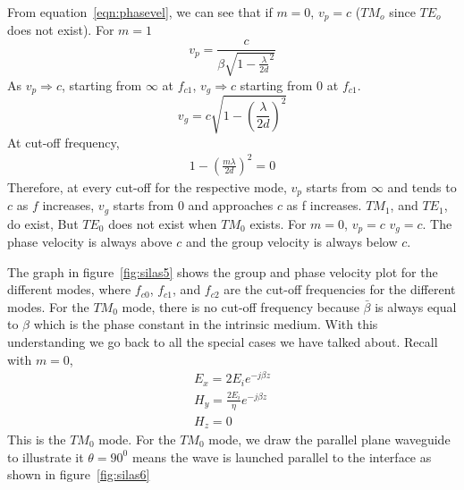 From equation~\ref{eqn:phasevel}, we can see that if $m=0$, $v_{p} =c$ ($TM_o$ since $TE_o$ does not exist). For $m=1$
\begin{equation*}
v_{p}= \frac{c}{\beta \sqrt{1- \frac{\lambda}{2d}^{2}}}
\end{equation*}
As $v_{p} \Rightarrow c$, starting from $\infty$ at $f_{c1}$, $v_{g} \Rightarrow c$ starting from 0 at $f_{c1}$.
\begin{equation*}
v_{g}= c\sqrt{1-\left(\frac{\lambda}{2d}\right)^{2}}
\end{equation*}
At cut-off frequency, 
\begin{align*}
1-\left(\frac{m\lambda}{2d}\right)^{2} = 0
\end{align*}
Therefore, at every cut-off for the respective mode, $v_{p}$ starts from $\infty$ and tends to $c$ as $f$ increases, $v_{g}$ starts from 0 and approaches $c$ as f increases. $TM_{1}$, and $TE_{1}$, do exist, But $TE_0$ does not exist when $TM_0$ exists. For $m = 0$, $v_{p}=c$ $v_{g}=c$. The phase velocity is always above $c$ and the group velocity is always below $c$.

The graph in figure~\ref{fig:silas5} shows the group and phase velocity plot for the different modes, where $f_{c0}$, $f_{c1}$, and $f_{c2}$ are the cut-off frequencies for the different modes. For the $TM_0$ mode, there is no cut-off frequency because $\bar{\beta}$ is always equal to $\beta$ which is the phase constant in the intrinsic medium. With this understanding we go back to all the special cases we have talked about. Recall with $m = 0$, 
\begin{align*}
E_{x} =2E_{i} e^{-j\beta z}\\
H_{y} = \frac{2E_{i}}{\eta} e^{-j\beta z}\\
H_{z} =0
\end{align*}
This is the $TM_0$ mode. For the $TM_0$ mode, we draw the parallel plane waveguide to illustrate it $\theta =90^{0}$ means the wave is launched parallel to the interface as shown in figure~\ref{fig:silas6}

